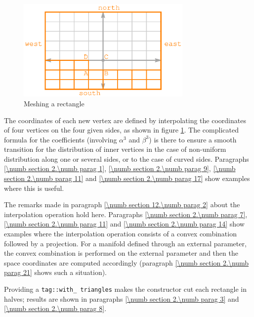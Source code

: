 \begin{figure}[ht] \centering
  \includegraphics[width=85mm]{fig-rectangle}
  \caption{Meshing a rectangle}
  \label{\numb section 12.\numb fig 1}
\end{figure}

The coordinates of each new vertex are defined by interpolating the coordinates of four vertices
on the four given sides, as shown in figure \ref{\numb section 12.\numb fig 1}.
The complicated formula for the coefficients (involving $ \alpha^3 $ and $ \beta^3 $) is there
to ensure a smooth transition for the distribution of inner vertices in the case of non-uniform
distribution along one or several sides, or to the case of curved sides.
Paragraphs \ref{\numb section 2.\numb parag 1}, \ref{\numb section 2.\numb parag 9},
\ref{\numb section 2.\numb parag 11} and \ref{\numb section 2.\numb parag 17} show
examples where this is useful.

The remarks made in paragraph \ref{\numb section 12.\numb parag 2} about
the interpolation operation hold here.
Paragraphs \ref{\numb section 2.\numb parag 7}, \ref{\numb section 2.\numb parag 11} and
\ref{\numb section 2.\numb parag 14} show examples where the interpolation operation
consists of a convex combination followed by a projection.
For a manifold defined through an external parameter, the convex combination is performed
on the external parameter and then the space coordinates are computed accordingly
(paragraph \ref{\numb section 2.\numb parag 21} shows such a situation).

Providing a {\small\tt \textcolor{tag}{tag}::with\_\,triangles} makes the constructor
cut each rectangle in halves; results are shown in paragraphs \ref{\numb section 2.\numb parag 3}
and \ref{\numb section 2.\numb parag 8}.

